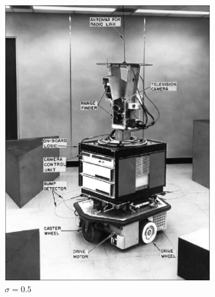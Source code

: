 \documentclass[lettersize,journal]{IEEEtran}
\begin{document}
\begin{figure}[h]
\begin{subfigure}[h]{0.115\textwidth}
        \includegraphics[width=\linewidth]{gaussian_map_5x5_sigma_0.5}
        \caption{$\sigma=0.5$}  
    \end{subfigure}
    \begin{subfigure}[h]{0.115\textwidth}
        \centering

\end{subfigure}
\end{figure}
\end{document}
